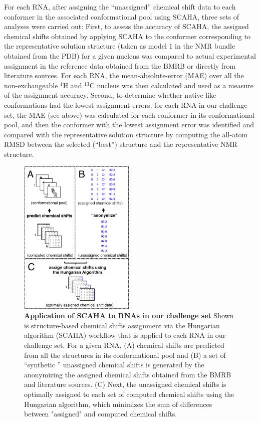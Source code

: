 \documentclass[journal=jcisd8,manuscript=article,layout=onecolumn]{achemso}
\begin{document}
For each RNA, after assigning the ``unassigned'' chemical shift data to each conformer in the associated conformational pool using SCAHA, three sets of analyses were carried out:  First, to assess the accuracy of SCAHA, the assigned chemical shifts obtained by applying SCAHA to the conformer corresponding to the representative solution structure (taken as model 1 in the NMR bundle obtained from the PDB) for a given nucleus was compared to actual experimental assignment in the reference data obtained from the BMRB or directly from literature sources. For each RNA, the mean-absolute-error (MAE) over all the non-exchangeable $^{1}$H and $^{13}$C nucleus was then calculated and used as a measure of the assignment accuracy. Second, to determine whether native-like conformations had the lowest assignment errors, for each RNA in our challenge set, the MAE (see above) was calculated for each conformer in its conformational pool, and then the conformer with the lowest assignment error was identified and compared with the representative solution structure by computing the all-atom RMSD between the selected (``best'')  structure and the representative NMR structure.  
\begin{figure}[h!]
  \centering
       \includegraphics[width=0.5\textwidth]{figure_0}
  \caption{\textbf{Application of SCAHA to RNAs in our challenge set} Shown is structure-based chemical shifts assignment via the Hungarian algorithm (SCAHA) workflow that is applied to each RNA in our challenge set. For a given RNA, (A) chemical shifts are predicted from all the structures in its conformational pool and (B) a set of ``synthetic '' unassigned chemical shifts is generated by the anonymizing the assigned chemical shifts obtained from the BMRB and literature sources. (C) Next, the unassigned chemical shifts is optimally assigned to each set of computed chemical shifts using the Hungarian algorithm, which minimizes the sum of differences between "assigned" and computed chemical shifts.}
  \label{fig:bar}
\end{figure}
\end{document}
